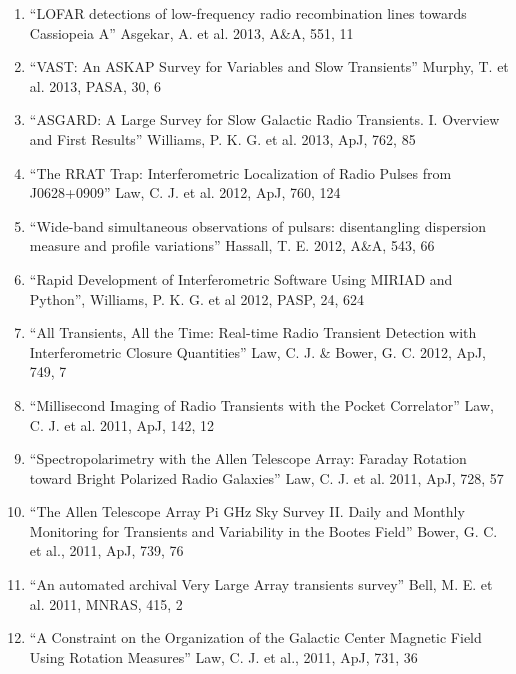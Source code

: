 \documentclass[12pt]{article}
\begin{document}
\begin{enumerate}
\item ``LOFAR detections of low-frequency radio recombination lines towards Cassiopeia A'' Asgekar, A. et al. 2013, A\&A, 551, 11

\item ``VAST: An ASKAP Survey for Variables and Slow Transients'' Murphy, T. et al. 2013, PASA, 30, 6

\item ``ASGARD: A Large Survey for Slow Galactic Radio Transients. I. Overview and First Results'' Williams, P. K. G. et al. 2013, ApJ, 762, 85

\item ``The RRAT Trap: Interferometric Localization of Radio Pulses from J0628+0909'' Law, C. J. et al. 2012, ApJ, 760, 124

\item ``Wide-band simultaneous observations of pulsars: disentangling dispersion measure and profile variations'' Hassall, T. E. 2012, A\&A, 543, 66

\item ``Rapid Development of Interferometric Software Using MIRIAD and Python'', Williams, P. K. G. et al 2012, PASP, 24, 624 

\item ``All Transients, All the Time: Real-time Radio Transient Detection with Interferometric Closure Quantities'' Law, C. J. \& Bower, G. C. 2012, ApJ, 749, 7

\item ``Millisecond Imaging of Radio Transients with the Pocket Correlator'' Law, C. J. et al. 2011, ApJ, 142, 12

\item ``Spectropolarimetry with the Allen Telescope Array:  Faraday Rotation toward Bright Polarized Radio Galaxies'' Law, C. J. et al. 2011, ApJ, 728, 57

\item ``The Allen Telescope Array Pi GHz Sky Survey II. Daily and Monthly Monitoring for Transients and Variability in the Bootes Field'' Bower, G. C. et al., 2011, ApJ, 739, 76

\item ``An automated archival Very Large Array transients survey'' Bell, M. E. et al. 2011, MNRAS, 415, 2

\item ``A Constraint on the Organization of the Galactic Center Magnetic Field Using Rotation Measures'' Law, C. J. et al., 2011, ApJ, 731, 36


\end{enumerate}
\end{document}
